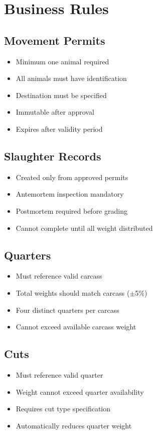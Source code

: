 \documentclass[11pt,a4paper]{article}
\begin{document}
\section{Business Rules}

\subsection{Movement Permits}
\begin{itemize}[leftmargin=*]
    \item Minimum one animal required
    \item All animals must have identification
    \item Destination must be specified
    \item Immutable after approval
    \item Expires after validity period
\end{itemize}

\subsection{Slaughter Records}
\begin{itemize}[leftmargin=*]
    \item Created only from approved permits
    \item Antemortem inspection mandatory
    \item Postmortem required before grading
    \item Cannot complete until all weight distributed
\end{itemize}

\subsection{Quarters}
\begin{itemize}[leftmargin=*]
    \item Must reference valid carcass
    \item Total weights should match carcass ($\pm$5\%)
    \item Four distinct quarters per carcass
    \item Cannot exceed available carcass weight
\end{itemize}

\subsection{Cuts}
\begin{itemize}[leftmargin=*]
    \item Must reference valid quarter
    \item Weight cannot exceed quarter availability
    \item Requires cut type specification
    \item Automatically reduces quarter weight
\end{itemize}
\end{document}
